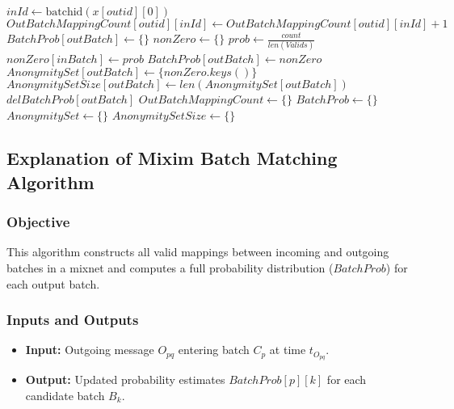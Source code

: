 \documentclass{article}
\begin{document}
\begin{algorithmic}[1]
            \State $ inId \gets \text{batchid}(x[outid][0])$
            \State $ OutBatchMappingCount[outid][inId] \gets OutBatchMappingCount[outid][inId] + 1$
        \EndIf
    \EndFor
\EndFor
{}
        \State $ BatchProb[outBatch] \gets \{ \} $
    \EndIf
    \State $ nonZero \gets \{ \} $
        \State $ prob \gets \frac{count}{len(Valids)}$
            \State $ nonZero[inBatch] \gets prob $
        \EndIf
    \EndFor
        \State $ BatchProb[outBatch] \gets nonZero $
        \State $ AnonymitySet[outBatch] \gets \{ nonZero.keys() \} $
        \State $ AnonymitySetSize[outBatch] \gets len(AnonymitySet[outBatch]) $
    \Else
            \State $ del BatchProb[outBatch] $
        \EndIf
    \EndIf
\EndFor
\State $ OutBatchMappingCount \gets \{ \} $
\State $ BatchProb \gets \{ \} $
\State $ AnonymitySet \gets \{ \} $
\State $ AnonymitySetSize \gets \{ \} $
\end{algorithmic}

\subsection{Explanation of Mixim Batch Matching Algorithm}

\subsubsection*{Objective}
This algorithm constructs all valid mappings between incoming and outgoing batches in a mixnet and computes a full probability distribution ($BatchProb$) for each output batch.

\subsubsection*{Inputs and Outputs}
\begin{itemize}
    \item \textbf{Input:} Outgoing message $O_{pq}$ entering batch $C_p$ at time $t_{O_{pq}}$.
    \item \textbf{Output:} Updated probability estimates ${BatchProb[p][k]}$ for each candidate batch $B_k$.
\end{itemize}
\end{document}
